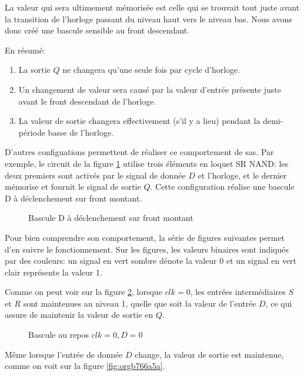 \documentclass[11pt]{article}
\begin{document}
La valeur qui sera ultimement mémorisée est celle qui se trouvait tout
juste avant la transition de l'horloge passant du niveau haut vers le
niveau bas. Nous avons donc créé une bascule sensible au front
descendant.

En résumé:
\begin{enumerate}
\item La sortie \(Q\) ne changera qu'une seule fois par cycle d'horloge.
\item Un changement de valeur sera causé par la valeur d'entrée présente
juste avant le front descendant de l'horloge.
\item La valeur de sortie changera effectivement (s'il y a lieu) pendant
la demi-période basse de l'horloge.
\end{enumerate}

D'autres configuations permettent de réaliser ce comportement de
sas. Par exemple, le circuit de la figure \ref{fig:org3bb944d} utilise
trois éléments en loquet SR NAND: les deux premiers sont activés par
le signal de donnée \(D\) et l'horloge, et le dernier mémorise et
fournit le signal de sortie \(Q\). Cette configuration réalise une
bascule D à déclenchement sur front montant.

\begin{figure}[htbp]
\centering

\caption{\label{fig:org3bb944d}Bascule D à déclenchement sur front montant}
\end{figure}

Pour bien comprendre son comportement, la série de figures suivantes
permet d'en suivre le fonctionnement. Sur les figures, les valeurs
binaires sont indiqués par des couleurs: un signal en vert sombre
dénote la valeur 0 et un signal en vert clair représente la valeur 1.

Comme on peut voir sur la figure \ref{fig:orgf7e42db}, lorsque \(clk = 0\), les
entrées intermédiaires \(S\) et \(R\) sont maintenues au niveau 1,
quelle que soit la valeur de l'entrée \(D\), ce qui assure de
maintenir la valeur de sortie en \(Q\).

\begin{figure}[htbp]
\centering

\caption{\label{fig:orgf7e42db}Bascule au repos  \(clk = 0, D=0\)}
\end{figure}

Même lorsque l'entrée de donnée \(D\) change, la valeur de sortie est
maintenue, comme on voit sur la figure \ref{fig:orgb766a5a}.
\end{document}
